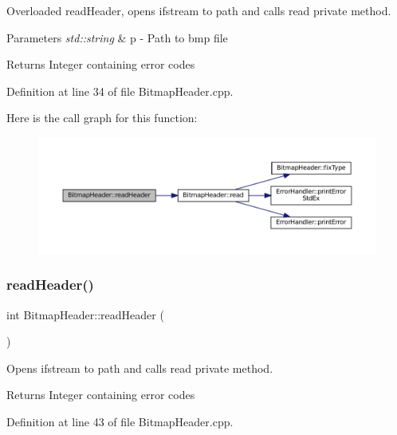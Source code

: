 Overloaded read\+Header, opens ifstream to path and calls read private method. 


\begin{DoxyParams}{Parameters}
{\em std\+::string} & p -\/ Path to bmp file \\
\hline
\end{DoxyParams}
\begin{DoxyReturn}{Returns}
Integer containing error codes 
\end{DoxyReturn}


Definition at line 34 of file Bitmap\+Header.\+cpp.

Here is the call graph for this function\+:\nopagebreak
\begin{figure}[H]
\begin{center}
\leavevmode
\includegraphics[width=350pt]{classBitmapHeader_a2de360d5111136167f5885bed561bc8c_cgraph}
\end{center}
\end{figure}
\mbox{\label{classBitmapHeader_a66adc11592dc1d18edbd46bade1db242}} 
\subsubsection{\texorpdfstring{readHeader()}{readHeader()}\hspace{0.1cm}{\footnotesize\ttfamily [2/2]}}
{\footnotesize\ttfamily int Bitmap\+Header\+::read\+Header (\begin{DoxyParamCaption}{ }\end{DoxyParamCaption})}



Opens ifstream to path and calls read private method. 

\begin{DoxyReturn}{Returns}
Integer containing error codes 
\end{DoxyReturn}


Definition at line 43 of file Bitmap\+Header.\+cpp.

